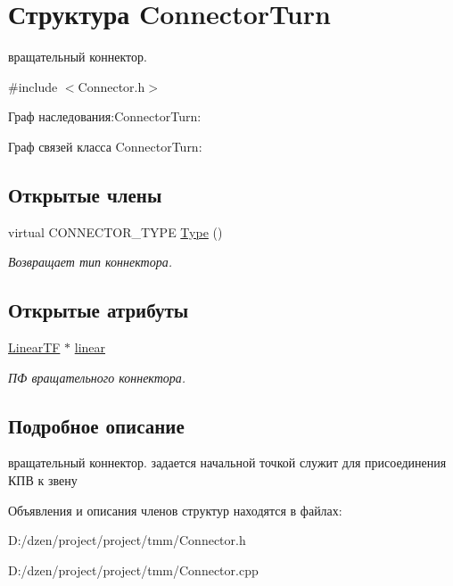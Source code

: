 \hypertarget{struct_connector_turn}{
\section{Структура ConnectorTurn}
\label{struct_connector_turn}
}


вращательный коннектор.  




{\ttfamily \#include $<$Connector.h$>$}



Граф наследования:ConnectorTurn:


Граф связей класса ConnectorTurn:
\subsection*{Открытые члены}
\begin{DoxyCompactItemize}
\item 
\hypertarget{struct_connector_turn_a19022db1fade0b619030b82c184ff264}{
virtual CONNECTOR\_\-TYPE \hyperlink{struct_connector_turn_a19022db1fade0b619030b82c184ff264}{Type} ()}
\label{struct_connector_turn_a19022db1fade0b619030b82c184ff264}

\begin{DoxyCompactList}\small\item\em Возвращает тип коннектора. \item\end{DoxyCompactList}\end{DoxyCompactItemize}
\subsection*{Открытые атрибуты}
\begin{DoxyCompactItemize}
\item 
\hypertarget{struct_connector_turn_adad7f2a62edc82af3b5c0b3d5b93abf5}{
\hyperlink{struct_linear_t_f}{LinearTF} $\ast$ \hyperlink{struct_connector_turn_adad7f2a62edc82af3b5c0b3d5b93abf5}{linear}}
\label{struct_connector_turn_adad7f2a62edc82af3b5c0b3d5b93abf5}

\begin{DoxyCompactList}\small\item\em ПФ вращательного коннектора. \item\end{DoxyCompactList}\end{DoxyCompactItemize}


\subsection{Подробное описание}
вращательный коннектор. задается начальной точкой служит для присоединения КПВ к звену 

Объявления и описания членов структур находятся в файлах:\begin{DoxyCompactItemize}
\item 
D:/dzen/project/project/tmm/Connector.h\item 
D:/dzen/project/project/tmm/Connector.cpp\end{DoxyCompactItemize}
